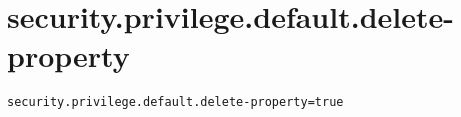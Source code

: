\section{security.privilege.default.delete-property}
\label{configuration:SecurityPrivilegeDefaultDeleteProperty}
\AvailableInJavaOnly{\TODO}
\begin{lstlisting}[style=Props,caption={Usage example for \textit{security.privilege.default.delete-property}}]
security.privilege.default.delete-property=true
\end{lstlisting}